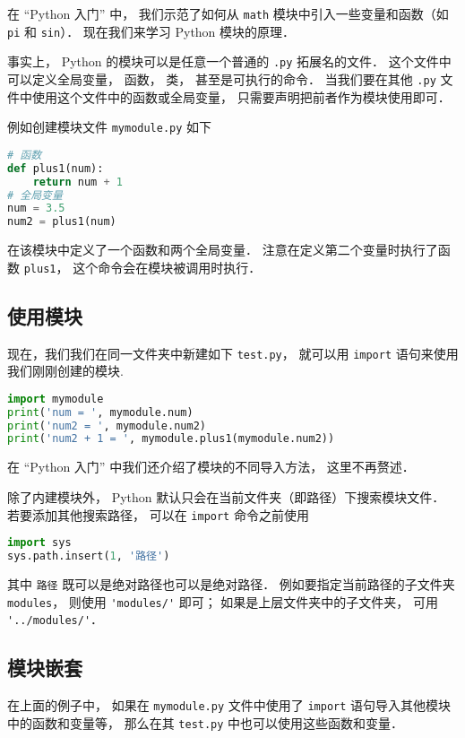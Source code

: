 

在 “Python 入门” 中， 我们示范了如何从 \verb|math| 模块中引入一些变量和函数（如 \verb|pi| 和 \verb|sin|）． 现在我们来学习 Python 模块的原理．

事实上， Python 的模块可以是任意一个普通的 \verb|.py| 拓展名的文件． 这个文件中可以定义全局变量， 函数， 类， 甚至是可执行的命令． 当我们要在其他 \verb|.py| 文件中使用这个文件中的函数或全局变量， 只需要声明把前者作为模块使用即可．

例如创建模块文件 \verb|mymodule.py| 如下
\begin{lstlisting}[language=python]
# 函数
def plus1(num):
    return num + 1
# 全局变量
num = 3.5
num2 = plus1(num)
\end{lstlisting}
在该模块中定义了一个函数和两个全局变量． 注意在定义第二个变量时执行了函数 \verb|plus1|， 这个命令会在模块被调用时执行．

\subsection{使用模块}
现在，我们我们在同一文件夹中新建如下 \verb|test.py|， 就可以用 \verb|import| 语句来使用我们刚刚创建的模块.
\begin{lstlisting}[language=python]
import mymodule
print('num = ', mymodule.num)
print('num2 = ', mymodule.num2)
print('num2 + 1 = ', mymodule.plus1(mymodule.num2))
\end{lstlisting}
在 “Python 入门” 中我们还介绍了模块的不同导入方法， 这里不再赘述．

除了内建模块外， Python 默认只会在当前文件夹（即路径）下搜索模块文件． 若要添加其他搜索路径， 可以在 \verb|import| 命令之前使用
\begin{lstlisting}[language=python]
import sys
sys.path.insert(1, '路径')
\end{lstlisting}
其中 \verb|路径| 既可以是绝对路径也可以是绝对路径． %
例如要指定当前路径的子文件夹 \verb|modules|， 则使用 \verb|'modules/'| 即可； 如果是上层文件夹中的子文件夹， 可用 \verb|'../modules/'|．

\subsection{模块嵌套}
在上面的例子中， 如果在 \verb|mymodule.py| 文件中使用了 \verb|import| 语句导入其他模块中的函数和变量等， 那么在其 \verb|test.py| 中也可以使用这些函数和变量．

